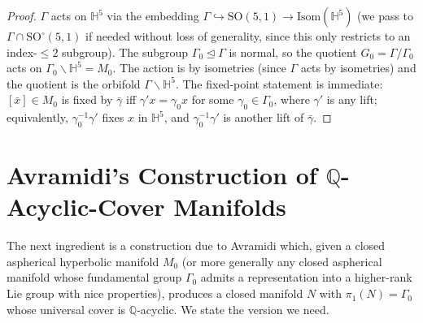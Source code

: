 \documentclass[12pt]{article}
\theoremstyle{definition}
\begin{document}
\begin{proof}
$\Gamma$ acts on $\mathbb{H}^5$ via the embedding $\Gamma\hookrightarrow\mathrm{SO}(5,1)\to\mathrm{Isom}(\mathbb{H}^5)$ (we pass to $\Gamma\cap\mathrm{SO}^\circ(5,1)$ if needed without loss of generality, since this only restricts to an index-$\leq 2$ subgroup). The subgroup $\Gamma_0\trianglelefteq\Gamma$ is normal, so the quotient $G_0=\Gamma/\Gamma_0$ acts on $\Gamma_0\backslash\mathbb{H}^5=M_0$. The action is by isometries (since $\Gamma$ acts by isometries) and the quotient is the orbifold $\Gamma\backslash\mathbb{H}^5$. The fixed-point statement is immediate: $[\bar x]\in M_0$ is fixed by $\bar\gamma$ iff $\gamma' x=\gamma_0 x$ for some $\gamma_0\in\Gamma_0$, where $\gamma'$ is any lift; equivalently, $\gamma_0^{-1}\gamma'$ fixes $x$ in $\mathbb{H}^5$, and $\gamma_0^{-1}\gamma'$ is another lift of $\bar\gamma$.
\end{proof}

\section{Avramidi's Construction of $\mathbb{Q}$-Acyclic-Cover Manifolds}\label{sec:avramidi}

The next ingredient is a construction due to Avramidi which, given a closed aspherical hyperbolic manifold $M_0$ (or more generally any closed aspherical manifold whose fundamental group $\Gamma_0$ admits a representation into a higher-rank Lie group with nice properties), produces a closed manifold $N$ with $\pi_1(N)=\Gamma_0$ whose universal cover is $\mathbb{Q}$-acyclic. We state the version we need.
\end{document}
